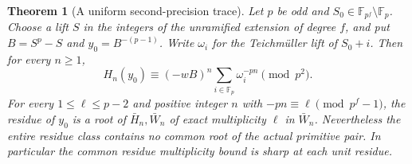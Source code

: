 \documentclass[11pt]{article}
\newtheorem{theorem}{Theorem}\newtheorem{lemma}[theorem]{Lemma}
\begin{document}
\begin{theorem}[A uniform second-precision trace]\label{thm:second-trace}
Let $p$ be odd and $S_0\in\mathbb F_{p^f}\setminus\mathbb F_p$.
Choose a lift $S$ in the integers of the unramified extension of
degree $f$, and put $B=S^p-S$ and $y_0=B^{-(p-1)}$.
Write $\omega_i$ for the Teichm\"uller lift of $S_0+i$.
Then for every $n\ge1$,
\[
 H_n(y_0)\equiv (-wB)^n\sum_{i\in\mathbb F_p}\omega_i^{-pn}
                                                 \pmod{p^2}.
 \tag{6}
\]
For every $1\le\ell\le p-2$ and positive integer $n$ with
$-pn\equiv\ell\pmod{p^f-1}$, the residue of $y_0$ is a
root of $\bar H_n,\bar W_n$ of exact multiplicity $\ell$ in
$\bar W_n$. Nevertheless the entire residue class contains
no common root of the actual primitive pair.
In particular the common residue multiplicity bound is sharp
at each unit residue.
\end{theorem}
\end{document}
